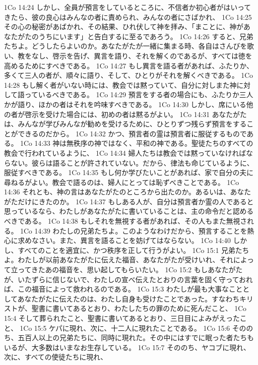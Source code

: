 1Co 14:24  しかし、全員が預言をしているところに、不信者か初心者がはいってきたら、彼の良心はみんなの者に責められ、みんなの者にさばかれ、
1Co 14:25  その心の秘密があばかれ、その結果、ひれ伏して神を拝み、「まことに、神があなたがたのうちにいます」と告白するに至るであろう。
1Co 14:26  すると、兄弟たちよ。どうしたらよいのか。あなたがたが一緒に集まる時、各自はさんびを歌い、教をなし、啓示を告げ、異言を語り、それを解くのであるが、すべては徳を高めるためにすべきである。
1Co 14:27  もし異言を語る者があれば、ふたりか、多くて三人の者が、順々に語り、そして、ひとりがそれを解くべきである。
1Co 14:28  もし解く者がいない時には、教会では黙っていて、自分に対しまた神に対して語っているべきである。
1Co 14:29  預言をする者の場合にも、ふたりか三人かが語り、ほかの者はそれを吟味すべきである。
1Co 14:30  しかし、席にいる他の者が啓示を受けた場合には、初めの者は黙るがよい。
1Co 14:31  あなたがたは、みんなが学びみんなが勧めを受けるために、ひとりずつ残らず預言をすることができるのだから。
1Co 14:32  かつ、預言者の霊は預言者に服従するものである。
1Co 14:33  神は無秩序の神ではなく、平和の神である。聖徒たちのすべての教会で行われているように、
1Co 14:34  婦人たちは教会では黙っていなければならない。彼らは語ることが許されていない。だから、律法も命じているように、服従すべきである。
1Co 14:35  もし何か学びたいことがあれば、家で自分の夫に尋ねるがよい。教会で語るのは、婦人にとっては恥ずべきことである。
1Co 14:36  それとも、神の言はあなたがたのところから出たのか。あるいは、あなたがただけにきたのか。
1Co 14:37  もしある人が、自分は預言者か霊の人であると思っているなら、わたしがあなたがたに書いていることは、主の命令だと認めるべきである。
1Co 14:38  もしそれを無視する者があれば、その人もまた無視される。
1Co 14:39  わたしの兄弟たちよ。このようなわけだから、預言することを熱心に求めなさい。また、異言を語ることを妨げてはならない。
1Co 14:40  しかし、すべてのことを適宜に、かつ秩序を正して行うがよい。
1Co 15:1  兄弟たちよ。わたしが以前あなたがたに伝えた福音、あなたがたが受けいれ、それによって立ってきたあの福音を、思い起してもらいたい。
1Co 15:2  もしあなたがたが、いたずらに信じないで、わたしの宣べ伝えたとおりの言葉を固く守っておれば、この福音によって救われるのである。
1Co 15:3  わたしが最も大事なこととしてあなたがたに伝えたのは、わたし自身も受けたことであった。すなわちキリストが、聖書に書いてあるとおり、わたしたちの罪のために死んだこと、
1Co 15:4  そして葬られたこと、聖書に書いてあるとおり、三日目によみがえったこと、
1Co 15:5  ケパに現れ、次に、十二人に現れたことである。
1Co 15:6  そののち、五百人以上の兄弟たちに、同時に現れた。その中にはすでに眠った者たちもいるが、大多数はいまなお生存している。
1Co 15:7  そののち、ヤコブに現れ、次に、すべての使徒たちに現れ、

